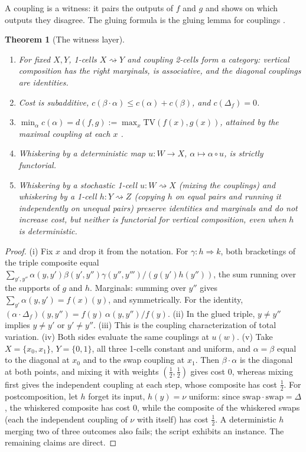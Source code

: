 \documentclass[11pt]{article}
\newtheorem{theorem}{Theorem}[section]
\theoremstyle{definition}
\theoremstyle{remark}
\newcommand{\TV}{\mathrm{TV}}
\begin{document}
A coupling is a witness: it pairs the outputs of $f$ and $g$ and shows on which outputs they
disagree. The gluing formula is the gluing lemma for couplings \cite[Ch.~1]{Villani2009}.

\begin{theorem}[The witness layer]\label{thm:witness}
\leavevmode
\begin{enumerate}[label=(\roman*)]
\item For fixed $X,Y$, 1-cells $X\rightsquigarrow Y$ and coupling 2-cells form a category: vertical
  composition has the right marginals, is associative, and the diagonal couplings are identities.
\item Cost is subadditive, $c(\beta\cdot\alpha)\le c(\alpha)+c(\beta)$, and $c(\Delta_f)=0$.
\item $\min_\alpha c(\alpha)=d(f,g):=\max_x\TV(f(x),g(x))$, attained by the maximal coupling at each
  $x$ \cite{Lindvall1992}.
\item Whiskering by a deterministic map $u\colon W\to X$, $\alpha\mapsto\alpha\circ u$, is strictly
  functorial.
\item Whiskering by a stochastic 1-cell $u\colon W\rightsquigarrow X$ (mixing the couplings) and
  whiskering by a 1-cell $h\colon Y\rightsquigarrow Z$ (copying $h$ on equal pairs and running it
  independently on unequal pairs) preserve identities and marginals and do not increase cost, but
  neither is functorial for vertical composition, even when $h$ is deterministic.
\end{enumerate}
\end{theorem}
\begin{proof}
(i) Fix $x$ and drop it from the notation. For $\gamma\colon h\Rightarrow k$, both bracketings of the
triple composite equal
$\sum_{y',y''}\alpha(y,y')\beta(y',y'')\gamma(y'',y''')/(g(y')h(y''))$, the sum running over the
supports of $g$ and $h$. Marginals: summing over $y''$
gives $\sum_{y'}\alpha(y,y')=f(x)(y)$, and symmetrically. For the identity,
$(\alpha\cdot\Delta_f)(y,y'')=f(y)\,\alpha(y,y'')/f(y)$. (ii) In the glued triple, $y\ne y''$
implies $y\ne y'$ or $y'\ne y''$. (iii) This is the coupling characterization of total variation.
(iv) Both sides evaluate the same couplings at $u(w)$. (v) Take $X=\{x_0,x_1\}$, $Y=\{0,1\}$,
all three 1-cells constant and uniform, and $\alpha=\beta$ equal to the diagonal at $x_0$ and to the swap coupling at $x_1$.
Then $\beta\cdot\alpha$ is the diagonal at both points, and mixing it with weights
$(\tfrac12,\tfrac12)$ gives cost $0$, whereas mixing first gives the independent coupling at each
step, whose composite has cost $\tfrac12$. For postcomposition, let $h$ forget its input,
$h(y)=\nu$ uniform: since $\mathrm{swap}\cdot\mathrm{swap}=\Delta$, the whiskered composite has cost $0$,
while the composite of the whiskered swaps (each the independent coupling of $\nu$ with itself) has
cost $\tfrac12$. A deterministic $h$ merging two of three outcomes also fails; the script exhibits an
instance. The remaining claims are direct.
\end{proof}
\end{document}
